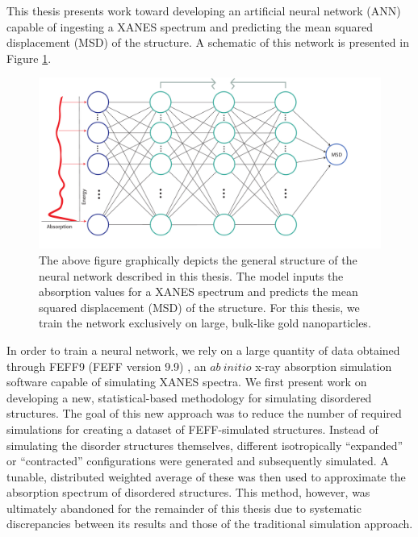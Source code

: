 

This thesis presents work toward developing an artificial neural network (ANN) capable of ingesting a XANES spectrum and predicting the mean squared displacement (MSD) of the structure. A schematic of this network is presented in Figure \ref{fig:thesis-design}. 

\begin{figure}[h!]
    \centering
    \includegraphics[width=\linewidth]{Chapters/Figures/thesis-design.pdf}
    \caption[Project Approach]{The above figure graphically depicts the general structure of the neural network described in this thesis. The model inputs the absorption values for a XANES spectrum and predicts the mean squared displacement (MSD) of the structure. For this thesis, we train the network exclusively on large, bulk-like gold nanoparticles.}
    \label{fig:thesis-design}
\end{figure}

In order to train a neural network, we rely on a large quantity of data obtained through FEFF9 (FEFF version 9.9) \cite{feff-citation}, an $ ab~initio $ x-ray absorption simulation software capable of simulating XANES spectra. We first present work on developing a new, statistical-based methodology for simulating disordered structures. The goal of this new approach was to reduce the number of required simulations for creating a dataset of FEFF-simulated structures. Instead of simulating the disorder structures themselves, different isotropically ``expanded'' or ``contracted'' configurations were generated and subsequently simulated. A tunable, distributed weighted average of these was then used to approximate the absorption spectrum of disordered structures. This method, however, was ultimately abandoned for the remainder of this thesis due to systematic discrepancies between its results and those of the traditional simulation approach. 

